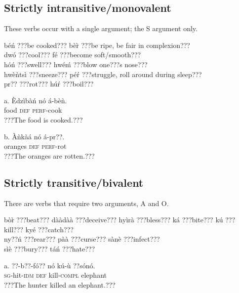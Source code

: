 \documentclass[output=paper]{langsci/langscibook}
\begin{document}
\subsection{Strictly intransitive/monovalent}

These verbs occur with a single argument; the S argument only.


\ea
béń   \textup{???be cooked???}     bè\`{r}   \textup{???be ripe, be fair in complexion???}   \\
dwó   \textup{???cool??? }      fé   \textup{???become soft/smooth???}  \\
hóń   \textup{???swell???}     hwéḿ   \textup{???blow one???s nose???} \\
hwèǹtsì   \textup{???sneeze???}     pé\'{r}   \textup{???struggle, roll around during sleep???}\\
pr??   \textup{???rot???}       hú\'{r}   \textup{???boil???} \\
\z

\ea
\gll a.  \`{E}dzìbàń  nó  á-bèǹ.\\
       food    \textsc{def}  \textsc{perf}{}-cook\\
\glt   ???The food is cooked.???
\z

\ea
\gll  b.  \`{A}ǹkàá    nó  á-pr??.\\
       oranges  \textsc{def}  \textsc{perf}{}-rot\\
\glt   ???The oranges are rotten.???
\z

\subsection{Strictly transitive/bivalent}

There are verbs that require two arguments, A and O.

\ea
 bò\`{r}   \textup{???beat???}    dààdàà   \textup{???deceive???}  hyìrà   \textup{???bless???}  
 ká     \textup{???bite???}    kú     \textup{???kill???}    kyé   \textup{???catch???}\\

 ny??ń   \textup{???rear???}    pàà     \textup{???curse???}    sànè   \textup{???infect???}    \\

 sìè     \textup{???bury???}    táń     \textup{???hate???}\\
 
 \z
 
 \ea
\gll a.  ??{}-b??-fó??  nó  kú-\`{u}     ??sónó.\\
       \textsc{sg}{}-hit-\textsc{idm}  \textsc{def}  kill-\textsc{compl}  elephant\\
\glt   ???The hunter killed an elephant.???  
\z
\end{document}
